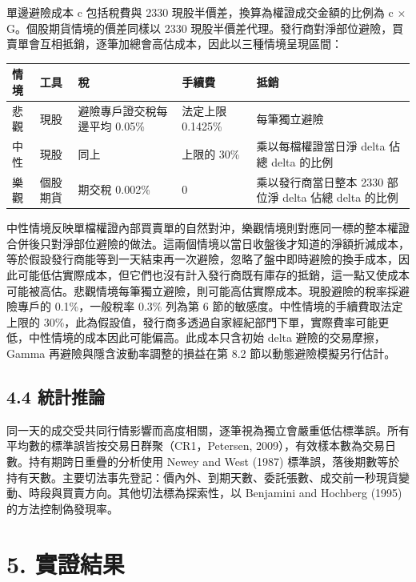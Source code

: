 \documentclass[12pt,a4paper]{article}
\begin{document}
單邊避險成本 c 包括稅費與 2330 現股半價差，換算為權證成交金額的比例為 c × G。個股期貨情境的價差同樣以 2330 現股半價差代理。發行商對淨部位避險，買賣單會互相抵銷，逐筆加總會高估成本，因此以三種情境呈現區間：

\begin{center}\small
\begin{tabularx}{\linewidth}{llYlY}
\toprule
\textbf{情境} & \textbf{工具} & \textbf{稅} & \textbf{手續費} & \textbf{抵銷} \\
\midrule
悲觀 & 現股 & 避險專戶證交稅每邊平均 0.05\% & 法定上限 0.1425\% & 每筆獨立避險 \\
中性 & 現股 & 同上 & 上限的 30\% & 乘以每檔權證當日淨 delta 佔總 delta 的比例 \\
樂觀 & 個股期貨 & 期交稅 0.002\% & 0 & 乘以發行商當日整本 2330 部位淨 delta 佔總 delta 的比例 \\
\bottomrule
\end{tabularx}
\end{center}

中性情境反映單檔權證內部買賣單的自然對沖，樂觀情境則對應同一標的整本權證合併後只對淨部位避險的做法。這兩個情境以當日收盤後才知道的淨額折減成本，等於假設發行商能等到一天結束再一次避險，忽略了盤中即時避險的換手成本，因此可能低估實際成本，但它們也沒有計入發行商既有庫存的抵銷，這一點又使成本可能被高估。悲觀情境每筆獨立避險，則可能高估實際成本。現股避險的稅率採避險專戶的 0.1\%，一般稅率 0.3\% 列為第 6 節的敏感度。中性情境的手續費取法定上限的 30\%，此為假設值，發行商多透過自家經紀部門下單，實際費率可能更低，中性情境的成本因此可能偏高。此成本只含初始 delta 避險的交易摩擦，Gamma 再避險與隱含波動率調整的損益在第 8.2 節以動態避險模擬另行估計。

\subsection*{4.4 統計推論}

同一天的成交受共同行情影響而高度相關，逐筆視為獨立會嚴重低估標準誤。所有平均數的標準誤皆按交易日群聚（CR1，Petersen, 2009），有效樣本數為交易日數。持有期跨日重疊的分析使用 Newey and West (1987) 標準誤，落後期數等於持有天數。主要切法事先登記：價內外、到期天數、委託張數、成交前一秒現貨變動、時段與買賣方向。其他切法標為探索性，以 Benjamini and Hochberg (1995) 的方法控制偽發現率。


\section*{5. 實證結果}
\end{document}
